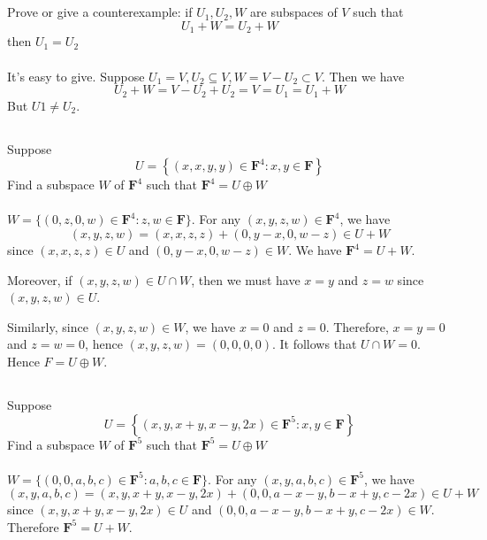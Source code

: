 \documentclass[a4paper]{article}
\begin{document}
\subsection{}
Prove or give a counterexample: if $U_{1}, U_{2}, W$ are subspaces of $V$ such that
\[
    U_{1}+W=U_{2}+W
\]
then $U_{1}=U_{2}$
\paragraph{}
It's easy to give. Suppose $U_1 = V, U_2 \subseteq V, W = V - U_2 \subset V$. Then we have
\[
    U_2 + W = V - U_2 + U_2 = V = U_1 = U_1 + W
\]
But $U1 \neq U_2$.

\subsection{}
Suppose
\[
    U=\left\{(x, x, y, y) \in \mathbf{F}^{4}: x, y \in \mathbf{F}\right\}
\]
Find a subspace $W$ of $\mathbf{F}^{4}$ such that $\mathbf{F}^{4}=U \oplus W$
\paragraph{}
$W = \{(0,z,0,w) \in \mathbf{F}^4: z, w\in \mathbf{F}\}$. For any $(x,y,z,w)\in \mathbf{F}^4$, we have
\[
    (x,y,z,w) = (x,x,z,z) +(0,y-x,0,w-z)\in U+W
\]
since $(x,x,z,z)\in U$ and $(0,y-x,0,w-z)\in W$. We have $\mathbf{F}^4 = U + W$.

Moreover, if $(x,y,z,w) \in U \cap W$, then we must have $x = y$ and $z = w$ since $(x,y,z,w) \in U$.

Similarly, since $(x,y,z,w)\in W$, we have $x = 0$ and $z = 0$. Therefore, $x = y = 0$ and $z = w = 0$, hence $(x,y,z,w) = (0,0,0,0)$.
It follows that $U\cap W = {0}$. Hence $F = U \oplus W$.

\subsection{}
Suppose
\[
    U=\left\{(x, y, x+y, x-y, 2 x) \in \mathbf{F}^{5}: x, y \in \mathbf{F}\right\}
\]
Find a subspace $W$ of $\mathbf{F}^{5}$ such that $\mathbf{F}^{5}=U \oplus W$
\paragraph{}
$W = \{(0,0,a,b,c)\in \mathbf{F}^5: a,b,c \in \mathbf{F}\}$. For any $(x,y,a,b,c)\in \mathbf{F}^5$, we have
\[
    (x,y,a,b,c) = (x,y,x+y,x-y,2x) + (0,0,a-x-y,b-x+y,c-2x)\in U+W
\]
since $(x,y,x+y,x-y,2x)\in U$ and $(0,0,a-x-y,b-x+y,c-2x) \in W$. Therefore $\mathbf{F}^5 = U + W$.
\end{document}
